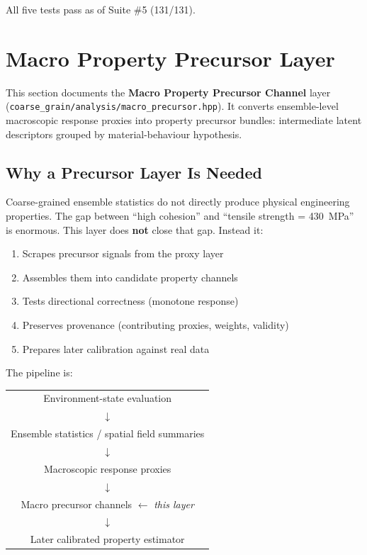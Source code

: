 \documentclass[11pt]{article}
\newcommand{\file}[1]{\texttt{#1}}
\begin{document}
All five tests pass as of Suite \#5 (131/131).

\section{Macro Property Precursor Layer}
\label{sec:macro_precursor}

This section documents the \textbf{Macro Property Precursor Channel}
layer (\file{coarse\_grain/analysis/macro\_precursor.hpp}).
It converts ensemble-level macroscopic response proxies into property
precursor bundles: intermediate latent descriptors grouped by
material-behaviour hypothesis.

\subsection{Why a Precursor Layer Is Needed}

Coarse-grained ensemble statistics do not directly produce physical
engineering properties.  The gap between ``high cohesion'' and
``tensile strength = 430~MPa'' is enormous.  This layer does
\textbf{not} close that gap.  Instead it:

\begin{enumerate}
  \item Scrapes precursor signals from the proxy layer
  \item Assembles them into candidate property channels
  \item Tests directional correctness (monotone response)
  \item Preserves provenance (contributing proxies, weights, validity)
  \item Prepares later calibration against real data
\end{enumerate}

The pipeline is:
\begin{center}
\begin{tabular}{c}
Environment-state evaluation \\
$\downarrow$ \\
Ensemble statistics / spatial field summaries \\
$\downarrow$ \\
Macroscopic response proxies \\
$\downarrow$ \\
Macro precursor channels \quad $\leftarrow$ \textit{this layer} \\
$\downarrow$ \\
Later calibrated property estimator
\end{tabular}
\end{center}
\end{document}

